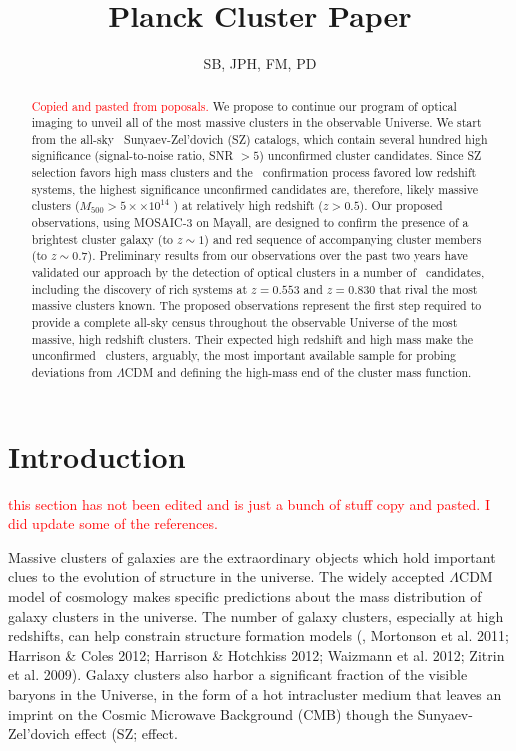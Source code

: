 \documentclass[apj, revtex4-1]{emulateapj}
\newcommand{\editorial}[1]{\textcolor{red}{#1}}
\begin{document}
\title{Planck Cluster Paper}

\author{\sc SB, JPH, FM, PD}


\begin{abstract}
	\noindent \editorial{Copied and pasted from poposals.} We propose to continue our program of optical imaging to unveil all of the most massive clusters in	the observable Universe. We start from the all-sky \planck\ Sunyaev-Zel'dovich (SZ) catalogs, which contain several hundred high significance (signal-to-noise ratio, SNR $> 5$) unconfirmed cluster candidates. Since SZ selection favors high mass clusters and the \planck\ confirmation process favored	low redshift systems, the highest significance unconfirmed candidates are, therefore, likely massive clusters ($M_{500} > 5 ×\times 10^{14}$ \Msol) at relatively high redshift ($z > 0.5$). Our proposed observations,	using MOSAIC-3 on Mayall, are designed to confirm the presence of a brightest cluster galaxy (to $z \sim 1$) and red sequence of accompanying cluster members (to $z \sim 0.7$). Preliminary results from our observations over the past two years have validated our approach by the detection of optical clusters in a number of \planck\ candidates, including the discovery of rich systems at $z = 0.553$ and $z = 0.830$ that rival the most massive clusters known. The proposed observations represent the first step required to provide a complete all-sky census throughout the observable Universe of the most massive, high redshift clusters. Their expected high redshift and high mass make the unconfirmed \planck\ clusters, arguably, the most important available sample for probing deviations from $\Lambda$CDM and defining the high-mass end of the cluster mass function.
\end{abstract}

\section{Introduction}
\editorial{this section has not been edited and is just a bunch of stuff copy and pasted. I did update some of the references.}

Massive clusters of galaxies are the extraordinary objects which hold important clues to the evolution of structure in the universe. The widely accepted $\Lambda$CDM model of cosmology makes specific predictions about the mass distribution of galaxy clusters in the universe. The number of galaxy clusters, especially at high redshifts, can help constrain structure formation models (\eg, Mortonson et al. 2011; Harrison \& Coles 2012; Harrison \& Hotchkiss 2012; Waizmann et al. 2012; Zitrin et al. 2009). Galaxy clusters also harbor a significant fraction of the visible baryons in the Universe, in the form of a hot intracluster medium that leaves an imprint on the Cosmic Microwave Background (CMB) though the Sunyaev-Zel'dovich effect (SZ; \citealt{Sunyaev1972} effect.
\end{document}
